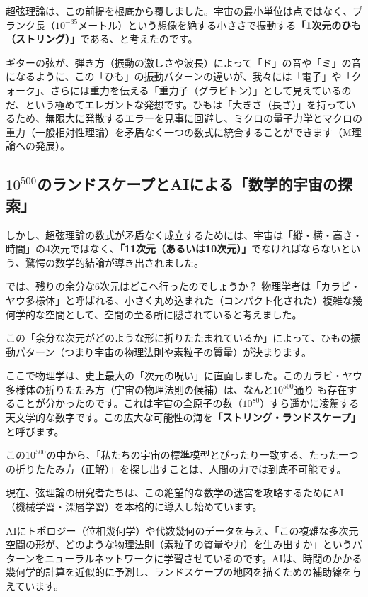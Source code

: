 超弦理論は、この前提を根底から覆しました。宇宙の最小単位は点ではなく、プランク長（\(10^{-35}\)メートル）という想像を絶する小ささで振動する\textbf{「1次元のひも（ストリング）」}である、と考えたのです。

ギターの弦が、弾き方（振動の激しさや波長）によって「ド」の音や「ミ」の音になるように、この「ひも」の振動パターンの違いが、我々には「電子」や「クォーク」、さらには重力を伝える「重力子（グラビトン）」として見えているのだ、という極めてエレガントな発想です。ひもは「大きさ（長さ）」を持っているため、無限大に発散するエラーを見事に回避し、ミクロの量子力学とマクロの重力（一般相対性理論）を矛盾なく一つの数式に統合することができます（M理論への発展）。

\subsection{\(10^{500}\)のランドスケープとAIによる「数学的宇宙の探索」}

しかし、超弦理論の数式が矛盾なく成立するためには、宇宙は「縦・横・高さ・時間」の4次元ではなく、\textbf{「11次元（あるいは10次元）」}でなければならないという、驚愕の数学的結論が導き出されました。

では、残りの余分な6次元はどこへ行ったのでしょうか？ 物理学者は「カラビ・ヤウ多様体」と呼ばれる、小さく丸め込まれた（コンパクト化された）複雑な幾何学的な空間として、空間の至る所に隠されていると考えました。

この「余分な次元がどのような形に折りたたまれているか」によって、ひもの振動パターン（つまり宇宙の物理法則や素粒子の質量）が決まります。

ここで物理学は、史上最大の「次元の呪い」に直面しました。このカラビ・ヤウ多様体の折りたたみ方（宇宙の物理法則の候補）は、なんと\(10^{500}\)通り も存在することが分かったのです。これは宇宙の全原子の数（\(10^{80}\)）すら遥かに凌駕する天文学的な数字です。この広大な可能性の海を\textbf{「ストリング・ランドスケープ」}と呼びます。

この\(10^{500}\)の中から、「私たちの宇宙の標準模型とぴったり一致する、たった一つの折りたたみ方（正解）」を探し出すことは、人間の力では到底不可能です。

現在、弦理論の研究者たちは、この絶望的な数学の迷宮を攻略するためにAI（機械学習・深層学習）を本格的に導入し始めています。

AIにトポロジー（位相幾何学）や代数幾何のデータを与え、「この複雑な多次元空間の形が、どのような物理法則（素粒子の質量や力）を生み出すか」というパターンをニューラルネットワークに学習させているのです。AIは、時間のかかる幾何学的計算を近似的に予測し、ランドスケープの地図を描くための補助線を与えています。

